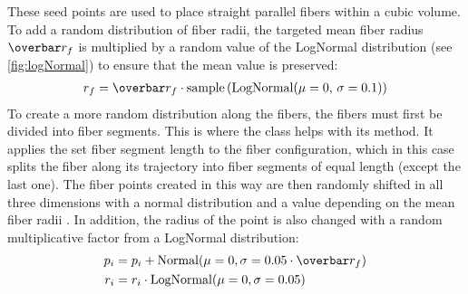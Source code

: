 % 
These seed points are used to place straight parallel fibers within a cubic volume.
To add a random distribution of fiber radii, the targeted mean fiber radius $\fiberRadiusMean$ is multiplied by a random value of the LogNormal distribution (see \cref{fig:logNormal}) to ensure that the mean value is preserved:
\begin{align}
\fiberRadius = \fiberRadiusMean \cdot \mathrm{sample}\left(\mathrm{LogNormal}(\mu=0, \, \sigma=0.1)\right)
\end{align}
% 
To create a more random distribution along the fibers, the fibers must first be divided into fiber segments.
This is where the  class helps with its  method.
It applies the set fiber segment length to the fiber configuration, which in this case splits the fiber along its trajectory into fiber segments of equal length (except the last one).
The fiber points created in this way are then randomly shifted in all three dimensions with a normal distribution and a value depending on the mean fiber radii \fiberRadiusMean{}.
In addition, the radius of the point is also changed with a random multiplicative factor from a LogNormal distribution:
% 
\begin{align}
\begin{split}
p_i &= p_i + \mathrm{Normal}(\mu=0,\sigma=0.05 \cdot \fiberRadiusMean)\\
r_i &= r_i \cdot \mathrm{LogNormal}(\mu=0,\sigma=0.05)
\end{split}
\end{align}
% 
% 
% 
